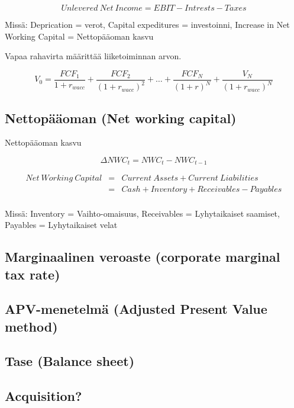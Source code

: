 \documentclass[a4paper]{article}
\begin{document}
\[Unlevered\ Net\ Income = EBIT - Intrests - Taxes\]


Missä: Deprication = verot, Capital expeditures = investoinni, Increase in Net Working Capital = Nettopääoman kasvu

Vapaa rahavirta määrittää liiketoiminnan arvon.

\[
V_0 = \frac{FCF_1}{1 + r_{wacc}} + \frac{FCF_2}{(1 + r_{wacc})^2} + \dots + \frac{FCF_N}{(1 + r)^N} + \frac{V_N}{(1 + r_{wacc})^N}
\]

\subsection{Nettopääoman (Net working capital)}

Nettopääoman kasvu

\[ \Delta NWC_t = NWC_t - NWC_{t-1} \]

\[
\begin{array}{lcl}
Net\ Working\ Capital & = & Current\ Assets + Current\ Liabilities \\
 & = & Cash + Inventory + Receivables - Payables \\
\end{array}
\]

Missä: Inventory = Vaihto-omaisuus, Receivables = Lyhytaikaiset saamiset, Payables = Lyhytaikaiset velat

\subsection{Marginaalinen veroaste (corporate marginal tax rate)}

\subsection{APV-menetelmä (Adjusted Present Value method)}

\subsection{Tase (Balance sheet)}

\subsection{Acquisition?}

\end{document}
